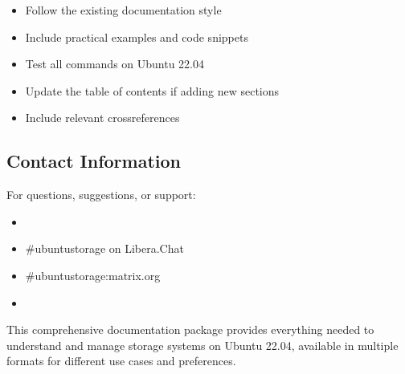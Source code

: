 \documentclass[letterpaper,10pt,english]{sphinxmanual}
\begin{document}
\sphinxAtStartPar
{}
\begin{itemize}
\item {} 
\sphinxAtStartPar
Follow the existing documentation style

\item {} 
\sphinxAtStartPar
Include practical examples and code snippets

\item {} 
\sphinxAtStartPar
Test all commands on Ubuntu 22.04

\item {} 
\sphinxAtStartPar
Update the table of contents if adding new sections

\item {} 
\sphinxAtStartPar
Include relevant cross\sphinxhyphen{}references

\end{itemize}


\subsection{Contact Information}
\label{\detokenize{downloads:contact-information}}
\sphinxAtStartPar
For questions, suggestions, or support:
\begin{itemize}
\item {} 
\sphinxAtStartPar
{} 

\item {} 
\sphinxAtStartPar
{} \#ubuntu\sphinxhyphen{}storage on Libera.Chat

\item {} 
\sphinxAtStartPar
{} \#ubuntu\sphinxhyphen{}storage:matrix.org

\item {} 
\sphinxAtStartPar
{} 

\end{itemize}

\sphinxAtStartPar
This comprehensive documentation package provides everything needed to understand and manage storage systems on Ubuntu 22.04, available in multiple formats for different use cases and preferences.
\end{document}
